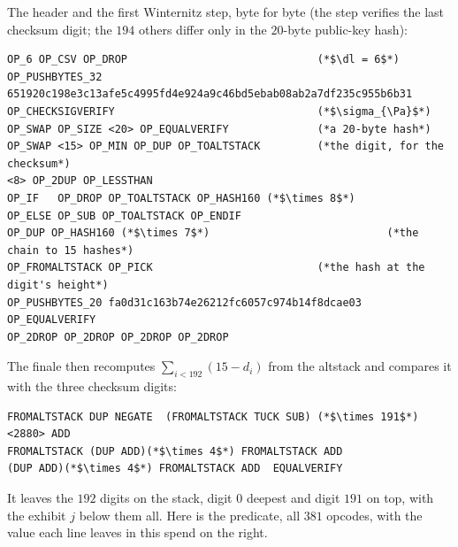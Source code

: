 \documentclass[11pt]{article}
\newcommand{\Pa}{\mathsf{A}}
\newcommand{\dl}{\delta}
\begin{document}
The header and the first Winternitz step, byte for byte (the step
verifies the last checksum digit; the $194$ others differ only in the
$20$-byte public-key hash):
\begin{lstlisting}[style=script]
OP_6 OP_CSV OP_DROP                              (*$\dl = 6$*)
OP_PUSHBYTES_32 651920c198e3c13afe5c4995fd4e924a9c46bd5ebab08ab2a7df235c955b6b31
OP_CHECKSIGVERIFY                                (*$\sigma_{\Pa}$*)
OP_SWAP OP_SIZE <20> OP_EQUALVERIFY              (*a 20-byte hash*)
OP_SWAP <15> OP_MIN OP_DUP OP_TOALTSTACK         (*the digit, for the checksum*)
<8> OP_2DUP OP_LESSTHAN
OP_IF   OP_DROP OP_TOALTSTACK OP_HASH160 (*$\times 8$*)
OP_ELSE OP_SUB OP_TOALTSTACK OP_ENDIF
OP_DUP OP_HASH160 (*$\times 7$*)                            (*the chain to 15 hashes*)
OP_FROMALTSTACK OP_PICK                          (*the hash at the digit's height*)
OP_PUSHBYTES_20 fa0d31c163b74e26212fc6057c974b14f8dcae03 OP_EQUALVERIFY
OP_2DROP OP_2DROP OP_2DROP OP_2DROP
\end{lstlisting}
The finale then recomputes $\sum_{i<192} (15 - d_i)$ from the
altstack and compares it with the three checksum digits:
\begin{lstlisting}[style=script]
FROMALTSTACK DUP NEGATE  (FROMALTSTACK TUCK SUB) (*$\times 191$*)  <2880> ADD
FROMALTSTACK (DUP ADD)(*$\times 4$*) FROMALTSTACK ADD
(DUP ADD)(*$\times 4$*) FROMALTSTACK ADD  EQUALVERIFY
\end{lstlisting}
It leaves the $192$ digits on the stack, digit $0$ deepest and digit
$191$ on top, with the exhibit $j$ below them all. Here is the
predicate, all $381$ opcodes, with the value each line leaves in this
spend on the right.
\end{document}
